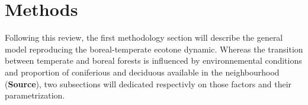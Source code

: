 
\section{Methods}   

Following this review, the first methodology section will describe the general
model reproducing the boreal-temperate ecotone dynamic. Whereas the transition
between temperate and boreal forests is influenced by environnemental
conditions and proportion of coniferious and deciduous available in the
neighbourhood (\textbf{Source}), two subsections will dedicated respectivly on
those factors and their parametrization. \\

